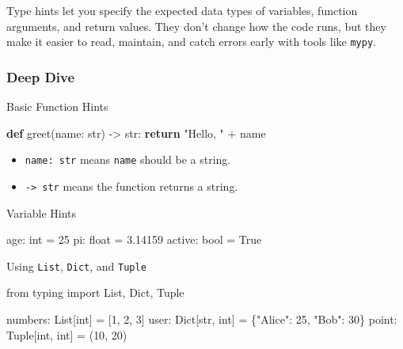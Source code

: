 \documentclass[
  letterpaper,
  DIV=11,
  numbers=noendperiod]{scrreprt}
\newenvironment{Shaded}{\begin{snugshade}}{\end{snugshade}}
\newcommand{\BuiltInTok}[1]{\textcolor[rgb]{0.00,0.23,0.31}{#1}}
\newcommand{\ControlFlowTok}[1]{\textcolor[rgb]{0.00,0.23,0.31}{\textbf{#1}}}
\newcommand{\DecValTok}[1]{\textcolor[rgb]{0.68,0.00,0.00}{#1}}
\newcommand{\FloatTok}[1]{\textcolor[rgb]{0.68,0.00,0.00}{#1}}
\newcommand{\ImportTok}[1]{\textcolor[rgb]{0.00,0.46,0.62}{#1}}
\newcommand{\KeywordTok}[1]{\textcolor[rgb]{0.00,0.23,0.31}{\textbf{#1}}}
\newcommand{\NormalTok}[1]{\textcolor[rgb]{0.00,0.23,0.31}{#1}}
\newcommand{\OperatorTok}[1]{\textcolor[rgb]{0.37,0.37,0.37}{#1}}
\newcommand{\StringTok}[1]{\textcolor[rgb]{0.13,0.47,0.30}{#1}}
\newcommand{\VariableTok}[1]{\textcolor[rgb]{0.07,0.07,0.07}{#1}}
\providecommand{\tightlist}{%
  \setlength{\itemsep}{0pt}\setlength{\parskip}{0pt}}
\begin{document}
Type hints let you specify the expected data types of variables,
function arguments, and return values. They don't change how the code
runs, but they make it easier to read, maintain, and catch errors early
with tools like \texttt{mypy}.

\subsubsection{Deep Dive}\label{deep-dive-89}

Basic Function Hints

\begin{Shaded}
\begin{Highlighting}[]
\KeywordTok{def}\NormalTok{ greet(name: }\BuiltInTok{str}\NormalTok{) }\OperatorTok{{-}\textgreater{}} \BuiltInTok{str}\NormalTok{:}
    \ControlFlowTok{return} \StringTok{"Hello, "} \OperatorTok{+}\NormalTok{ name}
\end{Highlighting}
\end{Shaded}

\begin{itemize}
\tightlist
\item
  \texttt{name:\ str} means \texttt{name} should be a string.
\item
  \texttt{-\textgreater{}\ str} means the function returns a string.
\end{itemize}

Variable Hints

\begin{Shaded}
\begin{Highlighting}[]
\NormalTok{age: }\BuiltInTok{int} \OperatorTok{=} \DecValTok{25}
\NormalTok{pi: }\BuiltInTok{float} \OperatorTok{=} \FloatTok{3.14159}
\NormalTok{active: }\BuiltInTok{bool} \OperatorTok{=} \VariableTok{True}
\end{Highlighting}
\end{Shaded}

Using \texttt{List}, \texttt{Dict}, and \texttt{Tuple}

\begin{Shaded}
\begin{Highlighting}[]
\ImportTok{from}\NormalTok{ typing }\ImportTok{import}\NormalTok{ List, Dict, Tuple}

\NormalTok{numbers: List[}\BuiltInTok{int}\NormalTok{] }\OperatorTok{=}\NormalTok{ [}\DecValTok{1}\NormalTok{, }\DecValTok{2}\NormalTok{, }\DecValTok{3}\NormalTok{]}
\NormalTok{user: Dict[}\BuiltInTok{str}\NormalTok{, }\BuiltInTok{int}\NormalTok{] }\OperatorTok{=}\NormalTok{ \{}\StringTok{"Alice"}\NormalTok{: }\DecValTok{25}\NormalTok{, }\StringTok{"Bob"}\NormalTok{: }\DecValTok{30}\NormalTok{\}}
\NormalTok{point: Tuple[}\BuiltInTok{int}\NormalTok{, }\BuiltInTok{int}\NormalTok{] }\OperatorTok{=}\NormalTok{ (}\DecValTok{10}\NormalTok{, }\DecValTok{20}\NormalTok{)}
\end{Highlighting}
\end{Shaded}
\end{document}
